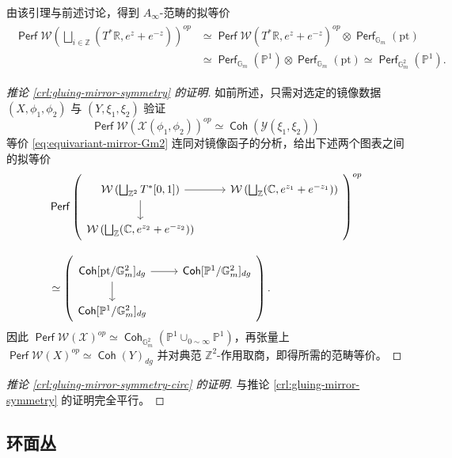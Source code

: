 \documentclass[11pt,a4paper]{article}
\DeclareMathOperator{\Coh}{\mathsf{Coh}}
\DeclareMathOperator{\Perf}{\mathsf{Perf}}
\theoremstyle{cnth}
\begin{document}
由该引理与前述讨论，得到 $A_{\infty}$-范畴的拟等价 \begin{align}\label{eq:equivariant-mirror-Gm2}
    \begin{split}
    \Perf\mathcal{W}\left(\bigsqcup_{i\in\mathbb{Z}} (T^{\ast}\mathbb{R},e^z+e^{-z})\right)^{op}&\simeq\Perf\mathcal{W} (T^{\ast}\mathbb{R},e^z+e^{-z})^{op}\otimes\Perf_{\mathbb{G}_m} (\mathrm{pt})\\ 
    &\simeq\Perf_{\mathbb{G}_m} (\mathbb{P}^1)\otimes\Perf_{\mathbb{G}_m} (\mathrm{pt})\simeq\Perf_{\mathbb{G}_m^2} (\mathbb{P}^1).
    \end{split}
\end{align}
\begin{proof}[推论 \ref{crl:gluing-mirror-symmetry} 的证明]
    如前所述，只需对选定的镜像数据 $(X,\phi_1,\phi_2)$ 与 $(Y,\xi_1,\xi_2)$ 验证 \[
        \Perf\mathcal{W}\left(\mathcal{X} (\phi_1,\phi_2)\right)^{op}\simeq\Coh\left(\mathcal{Y}(\xi_1,\xi_2)\right)
    \]等价 \eqref{eq:equivariant-mirror-Gm2} 连同对镜像函子的分析，给出下述两个图表之间的拟等价 \[
\begin{aligned}
&\Perf\left(
\begin{tikzcd}
\mathcal{W}\left(\bigsqcup_{\mathbb{Z}^2}T^{\ast}[0,1]\right)
  \arrow[r]\arrow[d]
&
\mathcal{W}\left(\bigsqcup_{\mathbb{Z}}(\mathbb{C},e^{z_1}+e^{-z_1})\right)
\\
\mathcal{W}\left(\bigsqcup_{\mathbb{Z}}(\mathbb{C},e^{z_2}+e^{-z_2})\right)
&
\end{tikzcd}
\right)^{op}
\\[1em]
&\simeq
\left(
\begin{tikzcd}
\Coh[\mathrm{pt}/\mathbb{G}_m^2]_{dg}\arrow[r]\arrow[d]
&
\Coh[\mathbb{P}^1/\mathbb{G}_m^2]_{dg}
\\
\Coh[\mathbb{P}^1/\mathbb{G}_m^2]_{dg}
&
\end{tikzcd}
\right).
\end{aligned}
\]因此 $\Perf\mathcal{W} (\mathcal{X})^{op}\simeq\Coh_{\mathbb{G}_m^2} (\mathbb{P}^1\cup_{0\sim\infty}\mathbb{P}^1)$，再张量上 $\Perf\mathcal{W} (X)^{op}\simeq\Coh (Y)_{dg}$ 并对典范 $\mathbb{Z}^2$-作用取商，即得所需的范畴等价。
\end{proof}
\begin{proof}[推论 \ref{crl:gluing-mirror-symmetry-circ} 的证明]
    与推论 \ref{crl:gluing-mirror-symmetry} 的证明完全平行。
\end{proof}

\subsection{环面丛}
\end{document}

